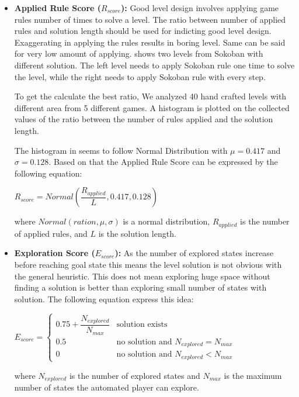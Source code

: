 \begin{itemize}
	\item \textbf{Applied Rule Score ($R_{score}$):} Good level design involves applying game rules number of times to solve a level. The ratio between number of applied rules and solution length should be used for indicting good level design. Exaggerating in applying the rules results in boring level. Same can be said for very low amount of applying.  shows two levels from Sokoban with different solution. The left level needs to apply Sokoban rule one time to solve the level, while the right needs to apply Sokoban rule with every step.
	
	
	To get the calculate the best ratio, We analyzed 40 hand crafted levels with different area from 5 different games. A histogram is plotted on the collected values of the ratio between the number of rules applied and the solution length.
	
	
	The histogram in  seems to follow  Normal Distribution with $\mu = 0.417$ and $\sigma = 0.128$. Based on that the Applied Rule Score can be expressed by the following equation:
	\begin{center}$R_{score} = Normal(\dfrac{R_{applied}}{L}, 0.417, 0.128)$\end{center}
	where $Normal(ration, \mu, \sigma)$ is a normal distribution, $R_{applied}$ is the number of applied rules, and $L$ is the solution length.
	
	\item \textbf{Exploration Score ($E_{score}$):} As the number of explored states increase before reaching goal state this means the level solution is not obvious with the general heuristic. This does not mean exploring huge space without finding a solution is better than exploring small number of states with solution. The following equation express this idea:
	\begin{center}
	$E_{score}= \begin{cases}
	               0.75 + \dfrac{N_{explored}}{N_{max}} & \text{solution exists}\\
	               0.5 & \text{no solution and }N_{explored} = N_{max}\\
	               0 & \text{no solution and }N_{explored} < N_{max}
	           \end{cases}$
	\end{center}
	where $N_{explored}$ is the number of explored states and $N_{max}$ is the maximum number of states the automated player can explore.
\end{itemize}

